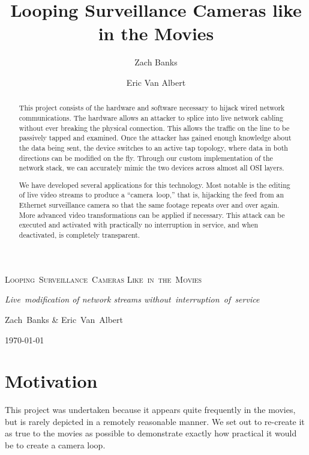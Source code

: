 \documentclass[12pt,notitlepage]{article}
\begin{document}
\title{Looping Surveillance Cameras like in the Movies}
\author{Zach Banks \and Eric Van Albert}

\begin{titlepage}
    \begin{center}
    \vspace{3in}

    \noindent 
    \textsc{\Huge Looping~Surveillance~Cameras Like~in~the~Movies}

    \vspace{1em}

    \noindent
    \textit{\Large Live~modification of network streams without~interruption~of~service}

    \vspace{1.5in}

    \noindent
    {\large Zach~Banks \& Eric~Van~Albert}

    \vspace{1em}

    \noindent
    {\large \today}

    \end{center}

\vfill

\begin{abstract}
This project consists of the hardware and software necessary to hijack wired network communications. The hardware allows an attacker to splice into live network cabling without ever breaking the physical connection. This allows the traffic on the line to be passively tapped and examined. Once the attacker has gained enough knowledge about the data being sent, the device switches to an active tap topology, where data in both directions can be modified on the fly. Through our custom implementation of the network stack, we can accurately mimic the two devices across almost all OSI layers.

We have developed several applications for this technology. Most notable is the editing of live video streams to produce a ``camera~loop,'' that is, hijacking the feed from an Ethernet surveillance camera so that the same footage repeats over and over again. More advanced video transformations can be applied if necessary. This attack can be executed and activated with practically no interruption in service, and when deactivated, is completely transparent.
\end{abstract}
\end{titlepage}

\newpage

\section{Motivation}
This project was undertaken because it appears quite frequently in the movies, but is rarely depicted in a remotely reasonable manner. We set out to re-create it as true to the movies as possible to demonstrate exactly how practical it would be to create a camera loop.
\end{document}
